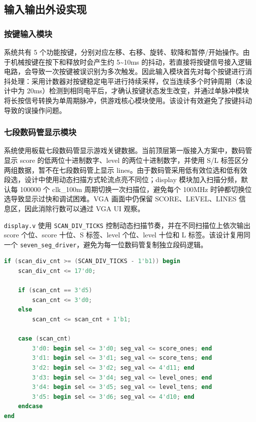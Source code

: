 \documentclass[UTF8,zihao=-4]{ctexart}
\begin{document}
\subsection{输入输出外设实现}
\subsubsection{按键输入模块}
系统共有 5 个功能按键，分别对应左移、右移、旋转、软降和暂停/开始操作。由于机械按键在按下和释放时会产生约 5\textasciitilde10ms 的抖动，若直接将按键信号接入逻辑电路，会导致一次按键被误识别为多次触发。因此输入模块首先对每个按键进行消抖处理：采用计数器对按键稳定电平进行持续采样，仅当连续多个时钟周期（本设计中为 20ms）检测到相同电平后，才确认按键状态发生改变，并通过单脉冲模块将长按信号转换为单周期脉冲，供游戏核心模块使用。该设计有效避免了按键抖动导致的误操作问题。

\subsubsection{七段数码管显示模块}
系统使用板载七段数码管显示游戏关键数据。当前顶层第一版接入方案中，数码管显示 score 的低两位十进制数字、level 的两位十进制数字，并使用 S/L 标签区分两组数据，暂不在七段数码管上显示 lines。由于数码管采用低有效位选和低有效段选，设计中使用动态扫描方式轮流点亮不同位；display 模块加入扫描分频，默认每 100000 个 clk\_100m 周期切换一次扫描位，避免每个 100MHz 时钟都切换位选导致显示过快和调试困难。VGA 画面中仍保留 SCORE、LEVEL、LINES 信息区，因此消除行数可以通过 VGA UI 观察。

\texttt{display.v} 使用 \texttt{SCAN\_DIV\_TICKS} 控制动态扫描节奏，并在不同扫描位上依次输出 score 个位、score 十位、S 标签、level 个位、level 十位和 L 标签。该设计复用同一个 \texttt{seven\_seg\_driver}，避免为每一位数码管复制独立段码逻辑。

\begin{lstlisting}[language=Verilog,caption={七段数码管动态扫描的关键逻辑},label={lst:seven_seg_scan}]
if (scan_div_cnt >= (SCAN_DIV_TICKS - 1'b1)) begin
    scan_div_cnt <= 17'd0;

    if (scan_cnt == 3'd5)
        scan_cnt <= 3'd0;
    else
        scan_cnt <= scan_cnt + 1'b1;

    case (scan_cnt)
        3'd0: begin sel <= 3'd0; seg_val <= score_ones; end
        3'd1: begin sel <= 3'd1; seg_val <= score_tens; end
        3'd2: begin sel <= 3'd2; seg_val <= 4'd11; end
        3'd3: begin sel <= 3'd4; seg_val <= level_ones; end
        3'd4: begin sel <= 3'd5; seg_val <= level_tens; end
        3'd5: begin sel <= 3'd6; seg_val <= 4'd10; end
    endcase
end
\end{lstlisting}
\end{document}
